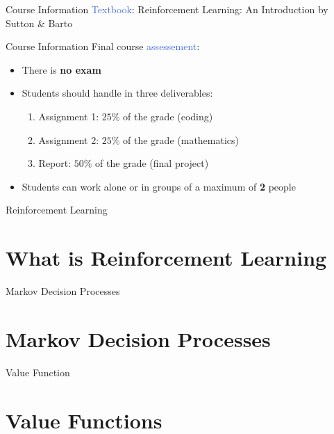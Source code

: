 \documentclass{beamer}
\begin{document}
\begin{frame}{Course Information}
	\textcolor{RoyalBlue}{Textbook}: Reinforcement Learning: An Introduction by Sutton \& Barto
\end{frame}

\begin{frame}{Course Information}
	Final course \textcolor{RoyalBlue}{assessement}:
	\begin{itemize}
		\item There is \textbf{no exam}
		\item Students should handle in three deliverables:
			\begin{enumerate}
				\item Assignment 1: $25\%$ of the grade (coding)
				\item Assignment 2: $25\%$ of the grade (mathematics)
				\item Report: $50\%$ of the grade (final project)
			\end{enumerate}
		\item Students can work alone or in groups of a maximum of \textbf{2} people 
	\end{itemize}

\end{frame}







\begin{frame}{Reinforcement Learning}
	\section{What is Reinforcement Learning}
\end{frame}

\begin{frame}{Markov Decision Processes}
	\section{Markov Decision Processes}

\end{frame}

\begin{frame}{Value Function}
	\section{Value Functions}

\end{frame}
\end{document}
